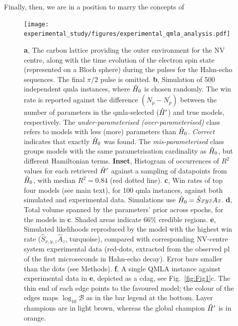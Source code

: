 \section{}
Finally, then, we are in a position to marry the concepts of 

\begin{figure}
    \label{fig:exp_qmla_analysis}
    \texttt{[image: experimental\_study/figures/experimental\_qmla\_analysis.pdf]}
    \caption[\gls{qmla} applied to experimental system.]{
        \textbf{a}, 
        The carbon lattice providing the outer environment for the NV centre, along with the
        time evolution of the electron spin state (represented on a Bloch sphere) during the pulses for the Hahn-echo sequences. The final $\pi/2$ pulse is omitted.  
        \textbf{b}, 
        Simulation of 500 independent \gls{qmla} instances, where $\hat{H}_0$ is chosen randomly. 
        The win rate is reported against the difference $(N_{p}-N^{\prime}_p)$ between the 
        number of parameters in the \gls{qmla}-selected ($\hat{H}^{\prime}$) and true models, respectively. 
        The \emph{under-parameterised} \emph{ (over-parameterised)} class refers to models with less (more) 
        parameters than $\hat{H}_0$. 
        \emph{Correct} indicates that exactly $\hat{H}_0$ was found. 
        The \emph{mis-parameterised} class groups models with the same parametrisation cardinality as $\hat{H}_0$, but different Hamiltonian terms. 
        \textbf{Inset}, Histogram of occurrences of $R^2$ values for each retrieved $\hat{H}^{\prime}$ 
        against a sampling of datapoints from $\hat{H}_0$, with median $R^2=0.84$ (red dotted line). 
        \textbf{c}, 
        Win rates of top four models (see main text), for 100 \gls{qmla} instances, 
        against both simulated and experimental data. 
        Simulations use $\hat{H}_0 = \hat{S}xyzAz$.
        \textbf{d}, 
        Total volume spanned by the parameters' prior across epochs, for the models in \textbf{c}. 
        Shaded areas indicate $66\%$ credible regions. 
        \textbf{e}, 
        Simulated likelihoods reproduced by the model with the highest win rate ($\hat{S}_{x,y,z}\hat{A}_{z}$, turquoise), compared with corresponding NV-centre system experimental data (red-dots, extracted from the observed \gls{pl} {of the first microseconds in Hahn-echo decay}). 
        Error bars smaller than the dots (see Methods).
        \textbf{f}, 
        A single QMLA instance against experimental data in \textbf{e}, depicted as a \gls{cdag}, see Fig.~\ref{fig:Fig1}c.
        The thin end of each edge points to the favoured model; 
        the colour of the edges maps $\log_{10}\mathcal{B}$ as in the bar legend at the bottom. 
        Layer champions \huc are in light brown, whereas the global champion $\hat{H}^{\prime}$  is in orange.    
    }
\end{figure}